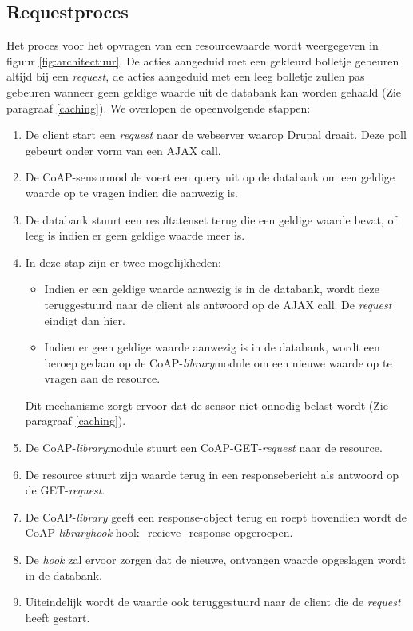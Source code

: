 \subsection{Requestproces}
Het proces voor het opvragen van een resourcewaarde wordt weergegeven in figuur \ref{fig:architectuur}. De acties aangeduid met een gekleurd bolletje gebeuren altijd bij een \textit{request}, de acties aangeduid met een leeg bolletje zullen pas gebeuren wanneer geen geldige waarde uit de databank kan worden gehaald (Zie paragraaf \ref{caching}). We overlopen de opeenvolgende stappen:
\begin{enumerate}
\item De client start een \textit{request} naar de webserver waarop Drupal draait. Deze poll gebeurt onder vorm van een AJAX call.
\item De CoAP-sensormodule voert een query uit op de databank om een geldige waarde op te vragen indien die aanwezig is.
\item De databank stuurt een resultatenset terug die een geldige waarde bevat, of leeg is indien er geen geldige waarde meer is.
\item In deze stap zijn er twee mogelijkheden:
\begin{itemize}
\item Indien er een geldige waarde aanwezig is in de databank, wordt deze teruggestuurd naar de client als antwoord op de AJAX call. De \textit{request} eindigt dan hier.
\item Indien er geen geldige waarde aanwezig is in de databank, wordt een beroep gedaan op de CoAP-\textit{library}module om een nieuwe waarde op te vragen aan de resource. 
\end{itemize}
Dit mechanisme zorgt ervoor dat de sensor niet onnodig belast wordt (Zie paragraaf \ref{caching}).
\item De CoAP-\textit{library}module stuurt een CoAP-GET-\textit{request} naar de resource.
\item De resource stuurt zijn waarde terug in een responsebericht als antwoord op de GET-\textit{request}.
\item De CoAP-\textit{library} geeft een response-object terug en roept bovendien wordt de CoAP-\textit{library}\textit{hook} hook\_recieve\_response opgeroepen.
\item De \textit{hook} zal ervoor zorgen dat de nieuwe, ontvangen waarde opgeslagen wordt in de databank.
\item Uiteindelijk wordt de waarde ook teruggestuurd naar de client die de \textit{request} heeft gestart.
\end{enumerate}
